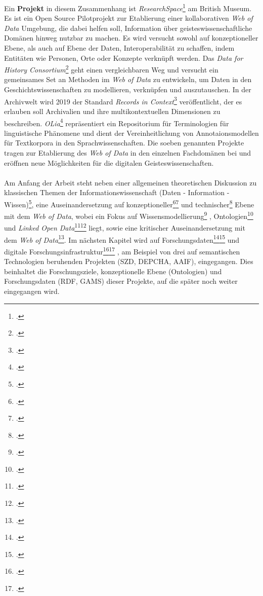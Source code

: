 \documentclass[12pt,a4paper]{article}
\begin{document}
Ein \textbf{Projekt} in diesem Zusammenhang ist \textit{ResearchSpace}\footcite{oldman2018reshaping} am British Museum. Es ist ein Open Source Pilotprojekt zur Etablierung einer kollaborativen \textit{Web of Data} Umgebung, die dabei helfen soll, Information über geisteswissenschaftliche Domänen hinweg nutzbar zu machen. Es wird versucht sowohl auf konzeptioneller Ebene, als auch auf Ebene der Daten, Interoperabilität zu schaffen, indem Entitäten wie Personen, Orte oder Konzepte verknüpft werden.
Das \textit{Data for History Consortium}\footcite{beretta2017dataforhistory} geht einen vergleichbaren Weg und versucht ein gemeinsames Set an Methoden im \textit{Web of Data} zu entwickeln, um Daten in den Geschichtswissenschaften zu modellieren, verknüpfen und auszutauschen.
In der Archivwelt wird 2019 der Standard \textit{Records in Context}\footcite{llanes2017records}
veröffentlicht, der es erlauben soll Archivalien und ihre multikontextuellen Dimensionen zu beschreiben.
\textit{OLia}\footcite{chiarcos2015olia} repräsentiert ein Repositorium für Terminologien für linguistische Phänomene und dient der Vereinheitlichung von Annotaionsmodellen für Textkorpora in den Sprachwissenschaften. 
Die soeben genannten Projekte tragen zur Etablierung des \textit{Web of Data} in den einzelnen Fachdomänen bei und eröffnen neue Möglichkeiten für die digitalen Geisteswissenschaften.
\\
\\
Am Anfang der Arbeit steht neben einer allgemeinen theoretischen Diskussion zu klassischen Themen der Informationswissenschaft (Daten - Information - Wissen)\footcite{favre2001information}, eine  Auseinandersetzung auf konzeptioneller\footcite{berners2001semantic}\footcite{cardoso2007semantic} und technischer\footcite{bernstein2016new} Ebene mit dem \textit{Web of Data}, wobei ein Fokus auf Wissensmodellierung\footcite{kelly2016practical} , Ontologien\footcite{stuckenschmidt2009ontologien} und \textit{Linked Open Data}\footcite{rietveld2015linked}\footcite{bauer2011linked} liegt, sowie eine kritischer Auseinandersetzung mit dem \textit{Web of Data}\footcite{swartz2013aaron}.
Im nächsten Kapitel wird auf Forschungsdaten\footcite{andorfer2015forschungsdaten}\footcite{cremer2018chimare} und digitale Forschungsinfrastruktur\footcite{burghardt2015informationsinfrastruktur}\footcite{neuroth2016nachhaltigkeit} , am Beispiel von drei auf semantischen Technologien beruhenden Projekten (SZD, DEPCHA, AAIF), eingegangen. Dies beinhaltet die Forschungsziele, konzeptionelle Ebene (Ontologien) und Forschungsdaten (RDF, GAMS) dieser Projekte, auf die später noch weiter eingegangen wird.
\end{document}
